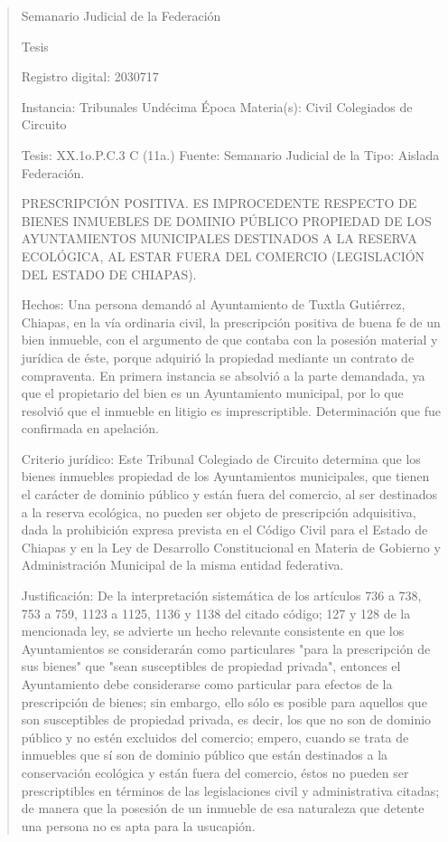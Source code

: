 \documentclass[11pt,a4paper]{article}
\begin{document}
\begin{quote}
                                                  Semanario Judicial de la Federación

                                              Tesis

 Registro digital: 2030717

 Instancia: Tribunales            Undécima Época                       Materia(s): Civil
 Colegiados de Circuito

 Tesis: XX.1o.P.C.3 C (11a.)      Fuente: Semanario Judicial de la     Tipo: Aislada
                                  Federación.


PRESCRIPCIÓN POSITIVA. ES IMPROCEDENTE RESPECTO DE BIENES INMUEBLES DE
DOMINIO PÚBLICO PROPIEDAD DE LOS AYUNTAMIENTOS MUNICIPALES DESTINADOS A LA
RESERVA ECOLÓGICA, AL ESTAR FUERA DEL COMERCIO (LEGISLACIÓN DEL ESTADO DE
CHIAPAS).


Hechos: Una persona demandó al Ayuntamiento de Tuxtla Gutiérrez, Chiapas, en la vía ordinaria
civil, la prescripción positiva de buena fe de un bien inmueble, con el argumento de que contaba con
la posesión material y jurídica de éste, porque adquirió la propiedad mediante un contrato de
compraventa. En primera instancia se absolvió a la parte demandada, ya que el propietario del bien
es un Ayuntamiento municipal, por lo que resolvió que el inmueble en litigio es imprescriptible.
Determinación que fue confirmada en apelación.

Criterio jurídico: Este Tribunal Colegiado de Circuito determina que los bienes inmuebles propiedad
de los Ayuntamientos municipales, que tienen el carácter de dominio público y están fuera del
comercio, al ser destinados a la reserva ecológica, no pueden ser objeto de prescripción adquisitiva,
dada la prohibición expresa prevista en el Código Civil para el Estado de Chiapas y en la Ley de
Desarrollo Constitucional en Materia de Gobierno y Administración Municipal de la misma entidad
federativa.

Justificación: De la interpretación sistemática de los artículos 736 a 738, 753 a 759, 1123 a 1125,
1136 y 1138 del citado código; 127 y 128 de la mencionada ley, se advierte un hecho relevante
consistente en que los Ayuntamientos se considerarán como particulares "para la prescripción de
sus bienes" que "sean susceptibles de propiedad privada", entonces el Ayuntamiento debe
considerarse como particular para efectos de la prescripción de bienes; sin embargo, ello sólo es
posible para aquellos que son susceptibles de propiedad privada, es decir, los que no son de
dominio público y no estén excluidos del comercio; empero, cuando se trata de inmuebles que sí
son de dominio público que están destinados a la conservación ecológica y están fuera del
comercio, éstos no pueden ser prescriptibles en términos de las legislaciones civil y administrativa
citadas; de manera que la posesión de un inmueble de esa naturaleza que detente una persona no
es apta para la usucapión.


\end{quote}
\end{document}
